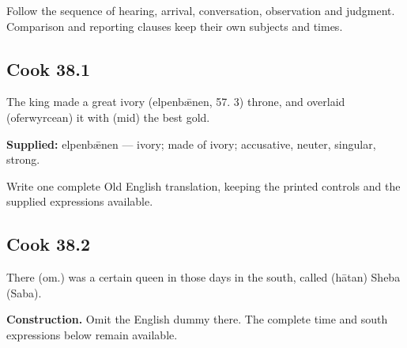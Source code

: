 Follow the sequence of hearing, arrival, conversation, observation and judgment. Comparison and reporting clauses keep their own subjects and times.

\par\begin{minipage}{\linewidth}\raggedright
\subsection*{Cook 38.1}

The king made a great ivory (elpenbǣnen, 57. 3) throne, and overlaid (oferwyrcean) it with (mid) the best gold.

\end{minipage}\par\addvspace{4pt}

\textbf{Supplied:} elpenbǣnen — ivory; made of ivory; accusative, neuter, singular, strong.

Write one complete Old English translation, keeping the printed controls and the supplied expressions available.

\par\begin{minipage}{\linewidth}\raggedright
\subsection*{Cook 38.2}

There (om.) was a certain queen in those days in the south, called (hātan) Sheba (Saba).

\end{minipage}\par\addvspace{4pt}

\textbf{Construction.} Omit the English dummy there. The complete time and south expressions below remain available.

